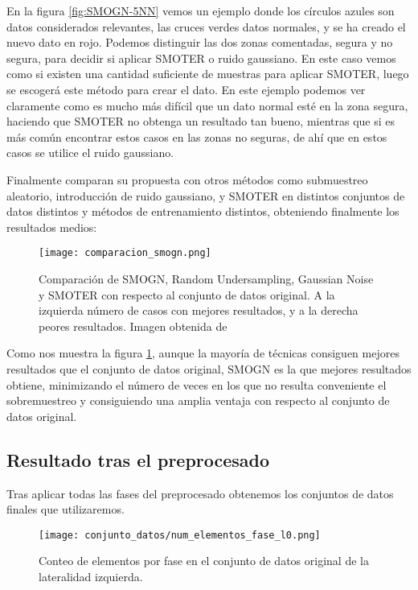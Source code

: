 En la figura \ref{fig:SMOGN-5NN} vemos un ejemplo donde los círculos azules son datos considerados relevantes, las cruces verdes datos normales, y se ha creado el nuevo dato en rojo. Podemos distinguir las dos zonas comentadas, segura y no segura, para decidir si aplicar SMOTER o ruido gaussiano. En este caso vemos como si existen una cantidad suficiente de muestras para aplicar SMOTER, luego se escogerá este método para crear el dato. En este ejemplo podemos ver claramente como es mucho más difícil que un dato normal esté en la zona segura, haciendo que SMOTER no obtenga un resultado tan bueno, mientras que si es más común encontrar estos casos en las zonas no seguras, de ahí que en estos casos se utilice el ruido gaussiano.

Finalmente comparan su propuesta con otros métodos como submuestreo aleatorio, introducción de ruido gaussiano, y SMOTER en distintos conjuntos de datos distintos y métodos de entrenamiento distintos, obteniendo finalmente los resultados medios:

\begin{figure}[H]
    \centering
	  \texttt{[image: comparacion\_smogn.png]}
    \caption{Comparación de SMOGN, Random Undersampling, Gaussian Noise y SMOTER con respecto al conjunto de datos original. A la izquierda número de casos con mejores resultados, y a la derecha peores resultados. Imagen obtenida de \cite{SMOGN}}
	 \label{fig:comparacion_smogn}
\end{figure}

Como nos muestra la figura \ref{fig:comparacion_smogn}, aunque la mayoría de técnicas consiguen mejores resultados que el conjunto de datos original, SMOGN es la que mejores resultados obtiene, minimizando el número de veces en los que no resulta conveniente el sobremuestreo y consiguiendo una amplia ventaja con respecto al conjunto de datos original.


\newpage

\subsection{Resultado tras el preprocesado}

Tras aplicar todas las fases del preprocesado obtenemos los conjuntos de datos finales que utilizaremos.

\begin{figure}[H]
    \centering
	  \texttt{[image: conjunto\_datos/num\_elementos\_fase\_l0.png]}
    \caption{Conteo de elementos por fase en el conjunto de datos original de la lateralidad izquierda.}
	 \label{fig:l0-orig}
\end{figure}

